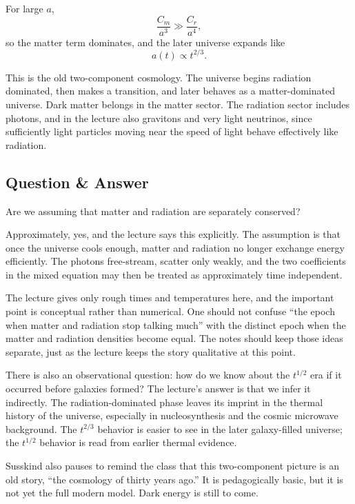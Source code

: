 For large \(a\),
\begin{equation}
\frac{C_m}{a^3}\gg \frac{C_r}{a^4},
\end{equation}
so the matter term dominates, and the later universe expands like
\begin{equation}
a(t)\propto t^{2/3}.
\end{equation}

This is the old two-component cosmology. The universe begins radiation dominated, then makes a transition, and later behaves as a matter-dominated universe. Dark matter belongs in the matter sector. The radiation sector includes photons, and in the lecture also gravitons and very light neutrinos, since sufficiently light particles moving near the speed of light behave effectively like radiation.

\subsection{Question \& Answer}

Are we assuming that matter and radiation are separately conserved?

Approximately, yes, and the lecture says this explicitly. The assumption is that once the universe cools enough, matter and radiation no longer exchange energy efficiently. The photons free-stream, scatter only weakly, and the two coefficients in the mixed equation may then be treated as approximately time independent.

The lecture gives only rough times and temperatures here, and the important point is conceptual rather than numerical. One should not confuse ``the epoch when matter and radiation stop talking much'' with the distinct epoch when the matter and radiation densities become equal. The notes should keep those ideas separate, just as the lecture keeps the story qualitative at this point.

There is also an observational question: how do we know about the \(t^{1/2}\) era if it occurred before galaxies formed? The lecture's answer is that we infer it indirectly. The radiation-dominated phase leaves its imprint in the thermal history of the universe, especially in nucleosynthesis and the cosmic microwave background. The \(t^{2/3}\) behavior is easier to see in the later galaxy-filled universe; the \(t^{1/2}\) behavior is read from earlier thermal evidence.

Susskind also pauses to remind the class that this two-component picture is an old story, ``the cosmology of thirty years ago.'' It is pedagogically basic, but it is not yet the full modern model. Dark energy is still to come.

